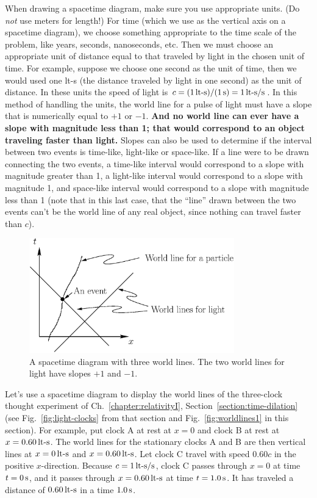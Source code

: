 When drawing a spacetime diagram, make sure you use appropriate units.
(Do {\em not} use meters for length!)  For time (which we use as the
vertical axis on a spacetime diagram), we choose something appropriate
to the time scale of the problem, like years, seconds, nanoseconds,
etc.  Then we must choose an appropriate unit of distance equal to
that traveled by light in the chosen unit of time.  For example,
suppose we choose one second as the unit of time, then we would used
one lt-s (the distance traveled by light in one second) as the unit of
distance.  In these units the speed of light is $c = 
(1\,\mbox{lt-s})/(1\,\mbox{s}) = 1\,\mbox{lt-s/s}$.  In this method of
handling the units, the world line for a pulse of light must have a
slope that is numerically equal to $+1$ or $-1$.  {\bf And no world line 
can ever have a slope with magnitude less than 1; that would
correspond to an object traveling faster than light.}  Slopes can also
be used to determine if the interval between two events is time-like,
light-like or space-like.  If a line were to be drawn connecting the
two events, a time-like interval would correspond to a slope with
magnitude greater than 1, a light-like interval would correspond to a
slope with magnitude 1, and space-like interval would correspond to a
slope with magnitude less than 1 (note that in this last case, that
the ``line'' drawn between the two events can't be the world line
of any real object, since nothing can travel faster than $c$).
    
\begin{figure}[tbp]
\begin{center}
\includegraphics[width=3.5in]{relativistic_spacetime/spacetime1.eps}
\end{center}
\caption{A spacetime diagram with three world lines.  The two world lines for 
light have slopes $+1$ and $-1$.}
\label{fig:spacetime-example}
\end{figure}

Let's use a spacetime diagram to display the world lines of the
three-clock thought experiment of Ch.~\ref{chapter:relativityI},
Section~\ref{section:time-dilation} (see Fig.~\ref{fig:light-clocks}
from that section and Fig.~\ref{fig:worldlines1} in this section).
For example, put clock A at rest at $x = 0$ and clock B at rest at $x
= 0.60\,\mbox{lt-s}$.  The world lines for the stationary clocks A
and B are then vertical lines at $x = 0\,\mbox{lt-s}$ and $x =
0.60\,\mbox{lt-s}$.  Let clock C travel with speed $0.60c$ in the
positive $x$-direction.  Because $c = 1\,\mbox{lt-s/s}$, clock C
passes through $x = 0$ at time $t = 0\,\mbox{s}$, and it passes
through $x = 0.60\,\mbox{lt-s}$ at time $t = 1.0\,\mbox{s}$.  It has 
traveled a distance of $0.60\,\mbox{lt-s}$ in a time $1.0\,\mbox{s}$.
    
